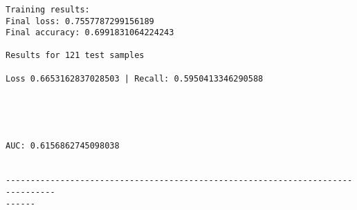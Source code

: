 \documentclass[11pt]{article}
\begin{document}
    \begin{center}
    \end{center}
    { \hspace*{\fill} \\}
    
    \begin{center}
    \end{center}
    { \hspace*{\fill} \\}
    
    \begin{Verbatim}[commandchars=\\\{\}]

Training results:
Final loss: 0.7557787299156189
Final accuracy: 0.6991831064224243

Results for 121 test samples

Loss 0.6653162837028503 | Recall: 0.5950413346290588



    \end{Verbatim}

    \begin{center}
    \end{center}
    { \hspace*{\fill} \\}
    
    \begin{Verbatim}[commandchars=\\\{\}]
AUC: 0.6156862745098038


--------------------------------------------------------------------------------
------


    \end{Verbatim}

    \begin{center}
    \end{center}
    { \hspace*{\fill} \\}
    
    \begin{center}
    \end{center}
    { \hspace*{\fill} \\}
    
\end{document}

